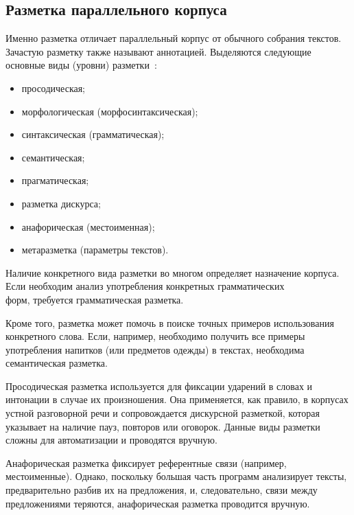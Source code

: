 \subsection{Разметка параллельного корпуса}

Именно разметка отличает параллельный корпус от обычного собрания текстов. 
Зачастую разметку также называют аннотацией. Выделяются следующие основные виды (уровни) разметки~\cite{annotation-russian}\cite{leech-annotation-schemes-1993}:

\begin{itemize}[label=---]
	\item просодическая;
	
	\item морфологическая (морфосинтаксическая);
	
	\item синтаксическая (грамматическая);
	
	\item семантическая;
	
	\item прагматическая;
	
	\item разметка дискурса;
	
	\item анафорическая (местоименная);
	
	\item метаразметка (параметры текстов).
\end{itemize}

Наличие конкретного вида разметки во многом определяет назначение корпуса. 
Если необходим анализ употребления конкретных грамматических \\форм, требуется грамматическая разметка.

Кроме того, разметка может помочь в поиске точных примеров использования конкретного слова. 
Если, например, необходимо получить все примеры употребления напитков (или предметов одежды) в текстах, необходима семантическая разметка.

Просодическая разметка используется для фиксации ударений в словах и интонации в случае их произношения. 
Она применяется, как правило, в корпусах устной разговорной речи и сопровождается дискурсной разметкой, которая указывает на наличие пауз, повторов или оговорок. Данные виды разметки сложны для автоматизации и проводятся вручную.

Анафорическая разметка фиксирует референтные связи (например, местоименные). Однако, поскольку большая часть программ анализирует тексты, предварительно разбив их на предложения, и, следовательно, связи между предложениями теряются, анафорическая разметка проводится вручную.

